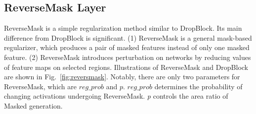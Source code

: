 \documentclass[runningheads]{llncs}
\begin{document}
\subsection{ReverseMask Layer}
\label{subsection:revermask}

    ReverseMask is a simple regularization method similar to DropBlock. Its main difference from DropBlock is significant. (1) ReverseMask is a general mask-based regularizer, which produces a pair of masked features instead of only one masked feature. (2) ReverseMask introduces perturbation on networks by reducing values of feature maps on selected regions. Illustrations of ReverseMask and DropBlock are shown in Fig.~\ref{fig:reversmask}. Notably, there are only two parameters for ReverseMask, which are {$reg\_prob$} and $p$. $reg\_prob$ determines the probability of changing activations undergoing ReverseMask. \textit{p} controls the area ratio of Masked generation. 
    
\end{document}
